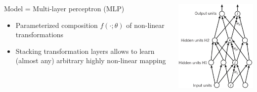 \documentclass{beamer}
\begin{document}
\begin{frame}
\begin{columns}
\begin{column}{0.65\textwidth}
                Model = Multi-layer perceptron (MLP)
                \begin{itemize}
                    \item Parameterized composition $f(\cdot; \theta)$ of non-linear transformations
                    \item Stacking transformation layers allows to learn (almost any) arbitrary highly non-linear mapping
                \end{itemize}
        \end{column}
        \begin{column}{0.4\textwidth}
            \centering
            \includegraphics[width=\textwidth]{figures/nn1.png}
        \end{column}
    \end{columns}


\end{frame}
\end{document}

